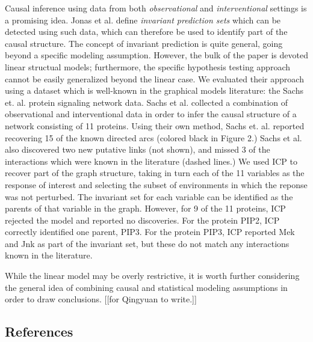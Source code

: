 \documentclass[12pt]{article}
\begin{document}
\maketitle

\newcommand{\tr}{\text{tr}}
\newcommand{\E}{\textbf{E}}
\newcommand{\diag}{\text{diag}}
\newcommand{\argmax}{\text{argmax}}
\newcommand{\Cov}{\text{Cov}}
\newcommand{\Var}{\text{Var}}
\newcommand{\argmin}{\text{argmin}}
\newcommand{\Vol}{\text{Vol}}
\newcommand{\comm}[1]{}

Causal inference using data from both \emph{observational}
and \emph{interventional} settings is a promising idea.  Jonas et
al. define \emph{invariant prediction sets} which can be detected
using such data, which can therefore be used to identify part of the
causal structure.  The concept of invariant prediction is quite
general, going beyond a specific modeling assumption.  However, the
bulk of the paper is devoted linear structual models; furthermore, the
specific hypothesis testing approach cannot be easily generalized
beyond the linear case.  We evaluated their approach using a dataset
which is well-known in the graphical models literature: the Sachs
et. al. protein signaling network data.  Sachs et al.  collected a
combination of observational and interventional data in order to infer
the causal structure of a network consisting of 11 proteins.  Using
their own method, Sachs et. al. reported recovering 15 of the known
directed arcs (colored black in Figure 2.)  Sachs et al. also
discovered two new putative links (not shown), and missed 3 of the
interactions which were known in the literature (dashed lines.) We
used ICP to recover part of the graph structure, taking in turn each
of the 11 variables as the response of interest and selecting the
subset of environments in which the reponse was not perturbed.  The
invariant set for each variable can be identified as the parents of
that variable in the graph.  However, for 9 of the 11 proteins, ICP
rejected the model and reported no discoveries.  For the protein PIP2,
ICP correctly identified one parent, PIP3.  For the protein PIP3, ICP
reported Mek and Jnk as part of the invariant set, but these do not
match any interactions known in the literature.

While the linear model may be overly restrictive, it is worth further
considering the general idea of combining causal and statistical
modeling assumptions in order to draw conclusions. [[for Qingyuan to write.]]

\subsection*{References}
\end{document}
